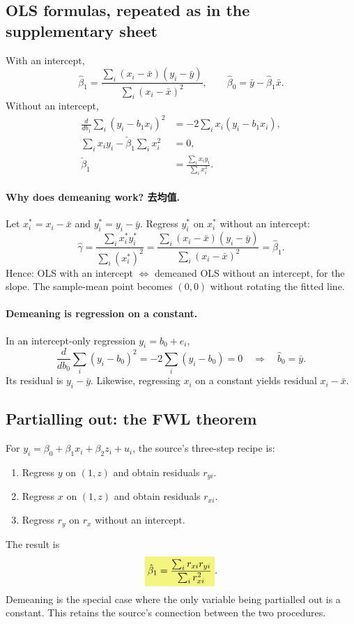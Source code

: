 \subsection{OLS formulas, repeated as in the supplementary sheet}
With an intercept,
\[\hat\beta_1=\frac{\sum_i(x_i-\bar x)(y_i-\bar y)}{\sum_i(x_i-\bar x)^2},
\qquad\hat\beta_0=\bar y-\hat\beta_1\bar x.\]
Without an intercept,
\begin{align*}
\frac{d}{db_1}\sum_i(y_i-b_1x_i)^2&=-2\sum_i x_i(y_i-b_1x_i),\\
\sum_i x_iy_i-\check\beta_1\sum_i x_i^2&=0,\\
\check\beta_1&=\frac{\sum_i x_iy_i}{\sum_i x_i^2}.
\end{align*}

\paragraph{Why does demeaning work? 去均值.}
Let $x_i^*=x_i-\bar x$ and $y_i^*=y_i-\bar y$. Regress $y_i^*$ on $x_i^*$ without an intercept:
\[\hat\gamma=\frac{\sum_i x_i^*y_i^*}{\sum_i(x_i^*)^2}
=\frac{\sum_i(x_i-\bar x)(y_i-\bar y)}{\sum_i(x_i-\bar x)^2}=\hat\beta_1.\]
Hence: OLS with an intercept $\Longleftrightarrow$ demeaned OLS without an intercept, for the slope. The sample-mean point becomes $(0,0)$ without rotating the fitted line.

\paragraph{Demeaning is regression on a constant.}
In an intercept-only regression $y_i=b_0+e_i$,
\[\frac{d}{db_0}\sum_i(y_i-b_0)^2=-2\sum_i(y_i-b_0)=0
\quad\Longrightarrow\quad\hat b_0=\bar y.\]
Its residual is $y_i-\bar y$. Likewise, regressing $x_i$ on a constant yields residual $x_i-\bar x$.

\subsection{Partialling out: the FWL theorem}
\label{sec:fwl-week3}
For $y_i=\beta_0+\beta_1x_i+\beta_2z_i+u_i$, the source's three-step recipe is:
\begin{enumerate}
\item Regress $y$ on $(1,z)$ and obtain residuals $r_{yi}$.
\item Regress $x$ on $(1,z)$ and obtain residuals $r_{xi}$.
\item Regress $r_y$ on $r_x$ without an intercept.
\end{enumerate}
The result is
\[\hm{\hat\beta_1=\frac{\sum_i r_{xi}r_{yi}}{\sum_i r_{xi}^2}}.\]
Demeaning is the special case where the only variable being partialled out is a constant. This retains the source's connection between the two procedures.

